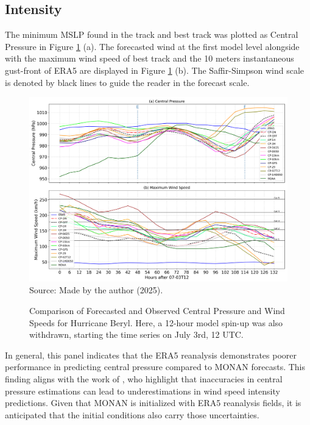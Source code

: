\subsection{Intensity}

The minimum MSLP found in the track and best track was plotted as Central Pressure in Figure \ref{fig:monera5} (a). The forecasted wind at the first model level alongside with the maximum wind speed of best track and the 10 meters instantaneous gust-front of ERA5 are displayed in Figure \ref{fig:monera5} (b). The Saffir-Simpson wind scale is denoted by black lines to guide the reader in the forecast scale. 

\begin{figure}[!ht]
	\centering
	\caption{Comparison of Forecasted and Observed Central Pressure and Wind Speeds for Hurricane Beryl. Here, a 12-hour model spin-up was also withdrawn, starting the time series on July 3rd, 12 UTC.} %
	\includegraphics[width=\textwidth]{docs/figuras/chapter5/intensity_time_series_panel_FINAL.png} 
	\vspace{0.5em}
	Source: Made by the author (2025).  %
	\label{fig:monera5} %
\end{figure}

In general, this panel indicates that the ERA5 reanalysis demonstrates poorer performance in predicting central pressure compared to MONAN forecasts. This finding aligns with the work of , who highlight that inaccuracies in central pressure estimations can lead to underestimations in wind speed intensity predictions. Given that MONAN is initialized with ERA5 reanalysis fields, it is anticipated that the initial conditions also carry those uncertainties.

